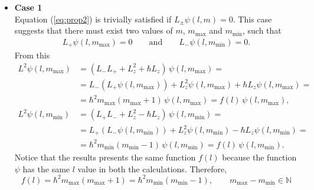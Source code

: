 \begin{itemize}
    \item \textbf{Case 1} \\
    Equation (\ref{eq:prop2}) is trivially satisfied if $L_\pm \psi (l,m) = 0$.  This case suggests that there must exist two values of $m$, $m_\text{max}$ and $m_\text{min}$, such that
\begin{align}
    L_+\psi(l,m_\text{max}) = 0 \qquad \text{and} \qquad L_- \psi(l,m_\text{min}) = 0. 
\end{align}
From this
\begin{align*}
        L^2 \psi(l,m_\text{max}) &= (L_- L_+ + L_z^2 + \hbar L_z) \, \psi(l,m_\text{max}) = \\ 
        &= L_-(L_+\psi(l,m_\text{max})) + L_z^2\psi(l,m_\text{max}) +\hbar L_z \psi(l,m_\text{max}) = \\ 
        &= \hbar^2 m_\text{max} (m_\text{max} + 1) \, \psi(l,m_\text{max}) = f(l) \, \psi(l,m_\text{max}), \\
        L^2 \psi(l,m_\text{min}) &= (L_+L_- + L_z^2 - \hbar L_z) \, \psi(l,m_\text{min}) = \\
        &= L_+(L_-\psi(l,m_\text{min})) + L_z^2\psi(l,m_\text{min}) -\hbar L_z \psi(l,m_\text{min}) = \\ 
        &= \hbar^2 m_\text{min} (m_\text{min} - 1) \, \psi(l,m_\text{min}) = f(l) \, \psi(l,m_\text{min}).
\end{align*}
Notice that the results presents the same function $f(l)$ because the function $\psi$ has the same $l$ value in both the calculations. Therefore, 
\begin{equation}
        f(l) = \hbar^2 m_\text{max} (m_\text{max} + 1) = \hbar^2 m_\text{min} (m_\text{min} - 1), \qquad m_\text{max} - m_\text{min} \in \mathbb{N}
    \label{eq:sistmaxmin}
\end{equation}


\end{itemize}
